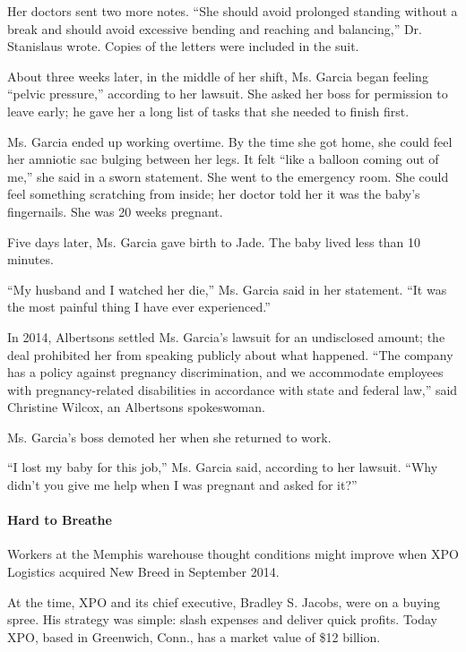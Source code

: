 Her doctors sent two more notes. ``She should avoid prolonged standing
without a break and should avoid excessive bending and reaching and
balancing,'' Dr. Stanislaus wrote. Copies of the letters were included
in the suit.

About three weeks later, in the middle of her shift, Ms. Garcia began
feeling ``pelvic pressure,'' according to her lawsuit. She asked her
boss for permission to leave early; he gave her a long list of tasks
that she needed to finish first.

Ms. Garcia ended up working overtime. By the time she got home, she
could feel her amniotic sac bulging between her legs. It felt ``like a
balloon coming out of me,'' she said in a sworn statement. She went to
the emergency room. She could feel something scratching from inside; her
doctor told her it was the baby's fingernails. She was 20 weeks
pregnant.

Five days later, Ms. Garcia gave birth to Jade. The baby lived less than
10 minutes.

``My husband and I watched her die,'' Ms. Garcia said in her statement.
``It was the most painful thing I have ever experienced.''

In 2014, Albertsons settled Ms. Garcia's lawsuit for an undisclosed
amount; the deal prohibited her from speaking publicly about what
happened. ``The company has a policy against pregnancy discrimination,
and we accommodate employees with pregnancy-related disabilities in
accordance with state and federal law,'' said Christine Wilcox, an
Albertsons spokeswoman.

Ms. Garcia's boss demoted her when she returned to work.

``I lost my baby for this job,'' Ms. Garcia said, according to her
lawsuit. ``Why didn't you give me help when I was pregnant and asked for
it?''

\hypertarget{hard-to-breathe}{%
\paragraph{Hard to Breathe}\label{hard-to-breathe}}

Workers at the Memphis warehouse thought conditions might improve when
XPO Logistics acquired New Breed in September 2014.

At the time, XPO and its chief executive, Bradley S. Jacobs, were on a
buying spree. His strategy was simple: slash expenses and deliver quick
profits. Today XPO, based in Greenwich, Conn., has a market value of
\$12 billion.

